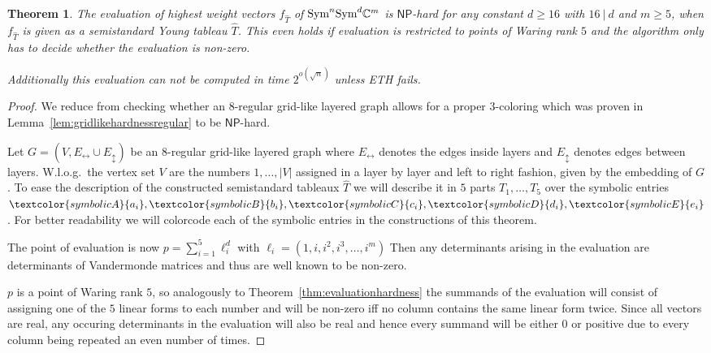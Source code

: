 \documentclass[10pt,a4paper]{article}
\numberwithin{equation}{section}
\newtheorem{theorem}[equation]{Theorem}
\theoremstyle{definition}
\newcommand{\Sym}{\textup{Sym}}
\newcommand{\IC}{\mathbb{C}}
\newcommand{\NP}{\ensuremath{\mathsf{NP}}}
\newcommand{\Ehor}{{\ensuremath{E_{\leftrightarrow}}}}
\newcommand{\Evert}{{\ensuremath{E_{\updownarrow}}}}
\begin{document}
\begin{theorem}
    \label{thm:semistdhardness}
    The evaluation of highest weight vectors $f_{\hat{T}}$ of $\Sym^n\Sym^d \IC^m$ is $\NP$-hard for any constant $d \geq 16$ with $16~|~d$  and $m \geq 5$, when $f_{\hat{T}}$ is given as a semistandard Young tableau $\hat{T}$.
    This even holds if evaluation is restricted to points of Waring rank $5$ and the algorithm only has to decide whether the evaluation is non-zero.

    Additionally this evaluation can not be computed in time $2^{o(\sqrt{n})}$ unless ETH fails.
\end{theorem}
\begin{proof}

    We reduce from checking whether an $8$-regular grid-like layered graph allows for a proper $3$-coloring which was proven in Lemma~\ref{lem:gridlikehardnessregular} to be \NP-hard.

    Let $G = (V, \Ehor \cup \Evert)$ be an $8$-regular grid-like layered graph where $\Ehor$ denotes the edges inside layers and $\Evert$ denotes edges between layers.
    W.l.o.g.\ the vertex set $V$ are the numbers $1, \ldots, |V|$ assigned in a layer by layer and left to right fashion, given by the embedding of $G$.
    To ease the description of the constructed semistandard tableaux $\hat{T}$ we will describe it in $5$ parts $T_1, \ldots, T_5$ over the symbolic entries $\textcolor{symbolicA}{a_i}, \textcolor{symbolicB}{b_i}, \textcolor{symbolicC}{c_i}, \textcolor{symbolicD}{d_i}, \textcolor{symbolicE}{e_i}$.
    For better readability we will colorcode each of the symbolic entries in the constructions of this theorem.

    The point of evaluation is now $p = \sum_{i=1}^5 \ell_i^d$ with $\ell_i = (1, i, i^2, i^3, \ldots, i^m)$
    Then any determinants arising in the evaluation are determinants of Vandermonde matrices and thus are well known to be non-zero.
    
    $p$ is a point of Waring rank $5$, so analogously to Theorem~\ref{thm:evaluationhardness} the summands of the evaluation will consist of assigning one of the $5$ linear forms to each number and will be non-zero iff no column contains the same linear form twice.
    Since all vectors are real, any occuring determinants in the evaluation will also be real and hence every summand will be either $0$ or positive due to every column being repeated an even number of times.


\end{proof}
\end{document}
